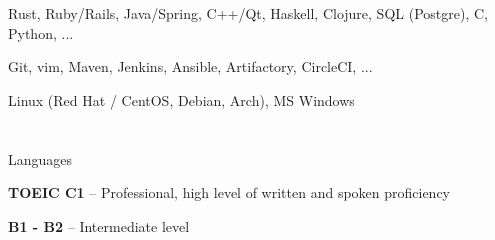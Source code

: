 \documentclass[a4paper, 10pt]{article}
\begin{document}
{Rust, Ruby/Rails, Java/Spring, C++/Qt, Haskell, Clojure, SQL (Postgre), C, Python, ...}

{Git, vim, Maven, Jenkins, Ansible, Artifactory, CircleCI, ...}

{Linux (Red Hat / CentOS, Debian, Arch), MS Windows}


\section{\faComment[regular]}{Languages}


{\textbf{TOEIC C1} -- Professional, high level of written and spoken proficiency}

{\textbf{B1 - B2} -- Intermediate level}
\end{document}
